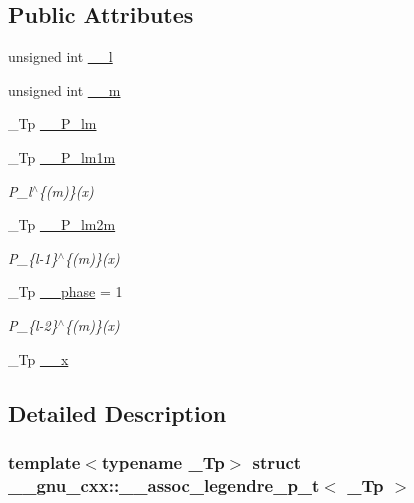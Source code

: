 \subsection*{Public Attributes}
\begin{DoxyCompactItemize}
\item 
unsigned int \hyperlink{struct____gnu__cxx_1_1____assoc__legendre__p__t_aeb1153fc2a0e0a3e8d2199bec70a8364}{\+\_\+\+\_\+l}
\item 
unsigned int \hyperlink{struct____gnu__cxx_1_1____assoc__legendre__p__t_adbf26f51e060973712c59da4d3447476}{\+\_\+\+\_\+m}
\item 
\+\_\+\+Tp \hyperlink{struct____gnu__cxx_1_1____assoc__legendre__p__t_aece6909511208b456caff5306ee338ae}{\+\_\+\+\_\+\+P\+\_\+lm}
\item 
\+\_\+\+Tp \hyperlink{struct____gnu__cxx_1_1____assoc__legendre__p__t_a14ae7a3cd23418de466cfa70c9c67501}{\+\_\+\+\_\+\+P\+\_\+lm1m}
\begin{DoxyCompactList}\small\item\em P\+\_\+l$^\wedge$\{(m)\}(x) \end{DoxyCompactList}\item 
\+\_\+\+Tp \hyperlink{struct____gnu__cxx_1_1____assoc__legendre__p__t_a2ae74e40b7a7a553acd807d38e332c4c}{\+\_\+\+\_\+\+P\+\_\+lm2m}
\begin{DoxyCompactList}\small\item\em P\+\_\+\{l-\/1\}$^\wedge$\{(m)\}(x) \end{DoxyCompactList}\item 
\+\_\+\+Tp \hyperlink{struct____gnu__cxx_1_1____assoc__legendre__p__t_ae4f6c562515b34a83b19f4998758f754}{\+\_\+\+\_\+phase} = 1
\begin{DoxyCompactList}\small\item\em P\+\_\+\{l-\/2\}$^\wedge$\{(m)\}(x) \end{DoxyCompactList}\item 
\+\_\+\+Tp \hyperlink{struct____gnu__cxx_1_1____assoc__legendre__p__t_a2de7db5bc670cc446e2a1ca92fd1a4d2}{\+\_\+\+\_\+x}
\end{DoxyCompactItemize}


\subsection{Detailed Description}
\subsubsection*{template$<$typename \+\_\+\+Tp$>$\newline
struct \+\_\+\+\_\+gnu\+\_\+cxx\+::\+\_\+\+\_\+assoc\+\_\+legendre\+\_\+p\+\_\+t$<$ \+\_\+\+Tp $>$}

